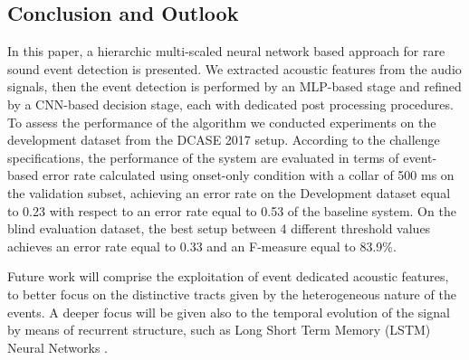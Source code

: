 \documentclass{article}
\begin{document}
\begin{sloppy}
\section{Conclusion and Outlook}
\label{sec:conclusion}
 In this paper, a hierarchic multi-scaled neural network based approach for rare sound event detection is presented.  We extracted acoustic features from the audio signals, then the event detection is performed by an MLP-based stage and refined by a CNN-based decision stage, each with dedicated post processing procedures. To assess the performance of the algorithm we conducted experiments on the development dataset from the DCASE 2017 setup. According to the challenge specifications, the performance of the system are evaluated in terms of event-based error rate calculated using onset-only condition with a collar of 500 ms on the validation subset, achieving an error rate on the Development dataset equal to 0.23 with respect to an error rate equal to 0.53 of the baseline system. On the blind evaluation dataset, the best setup between 4 different threshold values achieves an error rate equal to 0.33 and an F-measure equal to 83.9\%.
 
Future work will comprise the exploitation of event dedicated acoustic features, to better focus on the distinctive tracts given by the heterogeneous nature of the events. A deeper focus will be given also to the temporal evolution of the signal by means of recurrent structure, such as Long Short Term Memory (LSTM) Neural Networks \cite{hochreiter1997long}.
%



%


\end{sloppy}
\end{document}
